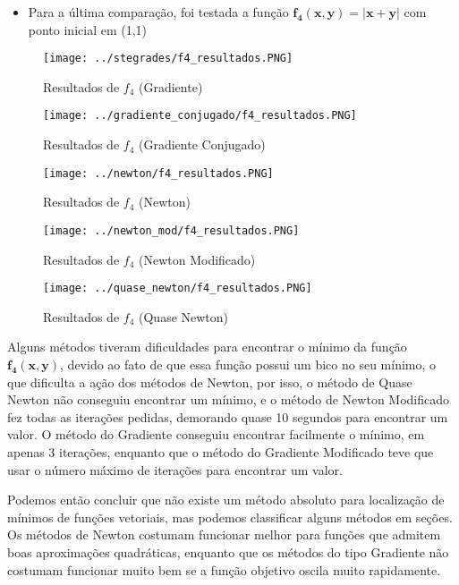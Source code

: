 \begin{itemize}
	\item Para a última comparação, foi testada a função $ \mathbf{f_4(x,y) = |x+y|} $ com ponto inicial em (1,1)
\end{itemize}


\begin{figure}[H]
	\centering
	\begin{minipage}{.5\textwidth}
		\centering
		\texttt{[image: ../stegrades/f4\_resultados.PNG]}
		\caption{Resultados de $ f_4 $ (Gradiente)}
		\label{fig:resultados_grad_f4}
	\end{minipage}%
	\begin{minipage}{.5\textwidth}
		\centering
		\texttt{[image: ../gradiente\_conjugado/f4\_resultados.PNG]}
		\caption{Resultados de $ f_4 $ (Gradiente Conjugado)}
		\label{fig:resultados_grad_conj_f4}
	\end{minipage}
\end{figure}

\begin{figure}[H]
	\centering
	\begin{minipage}{.5\textwidth}
		\centering
		\texttt{[image: ../newton/f4\_resultados.PNG]}
		\caption{Resultados de $ f_4 $ (Newton)}
		\label{fig:resultados_newton_f4}
	\end{minipage}%
	\begin{minipage}{.5\textwidth}
		\centering
		\texttt{[image: ../newton\_mod/f4\_resultados.PNG]}
		\caption{Resultados de $ f_4 $ (Newton Modificado)}
		\label{fig:resultados_newton_mod_f4}
	\end{minipage}
\end{figure}

\begin{figure}[H]
	\begin{center}
		\texttt{[image: ../quase\_newton/f4\_resultados.PNG]}   
		\caption{Resultados de $ f_4 $ (Quase Newton)}
		\label{fig:resultados_quase_newton_f4}
	\end{center}
\end{figure}

Alguns métodos tiveram dificuldades para encontrar o mínimo da função $ \mathbf{f_4(x,y)} $, devido ao fato de que essa função possui um bico no seu mínimo, o que dificulta a ação dos métodos de Newton, por isso, o método de Quase Newton não conseguiu encontrar um mínimo, e o método de Newton Modificado fez todas as iterações pedidas, demorando quase 10 segundos para encontrar um valor. O método do Gradiente conseguiu encontrar facilmente o mínimo, em apenas 3 iterações, enquanto que o método do Gradiente Modificado teve que usar o número máximo de iterações para encontrar um valor.

Podemos então concluir que não existe um método absoluto para localização de mínimos de funções vetoriais, mas podemos classificar alguns métodos em seções. Os métodos de Newton costumam funcionar melhor para funções que admitem boas aproximações quadráticas, enquanto que os métodos do tipo Gradiente não costumam funcionar muito bem se a função objetivo oscila muito rapidamente.